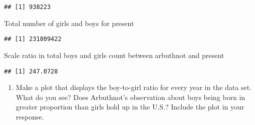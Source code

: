 \documentclass[]{article}
\newenvironment{Shaded}{\begin{snugshade}}{\end{snugshade}}
\newcommand{\KeywordTok}[1]{\textcolor[rgb]{0.13,0.29,0.53}{\textbf{#1}}}
\newcommand{\NormalTok}[1]{#1}
\newcommand{\OperatorTok}[1]{\textcolor[rgb]{0.81,0.36,0.00}{\textbf{#1}}}
\newcommand{\StringTok}[1]{\textcolor[rgb]{0.31,0.60,0.02}{#1}}
\providecommand{\tightlist}{%
  \setlength{\itemsep}{0pt}\setlength{\parskip}{0pt}}
\begin{document}
\begin{Shaded}
\end{Shaded}

\begin{verbatim}
## [1] 938223
\end{verbatim}

Total number of girls and boys for present

\begin{Shaded}
\end{Shaded}

\begin{verbatim}
## [1] 231809422
\end{verbatim}

Scale ratio in total boys and girls count between arbuthnot and present

\begin{Shaded}
\end{Shaded}

\begin{verbatim}
## [1] 247.0728
\end{verbatim}

\begin{enumerate}
\def\labelenumi{\arabic{enumi}.}
\setcounter{enumi}{2}
\tightlist
\item
  Make a plot that displays the boy-to-girl ratio for every year in the
  data set. What do you see? Does Arbuthnot's observation about boys
  being born in greater proportion than girls hold up in the U.S.?
  Include the plot in your response.
\end{enumerate}
\end{document}
